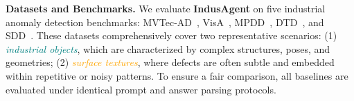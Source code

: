 \documentclass{article}
\begin{document}
\textbf{Datasets and Benchmarks.}
We evaluate \textbf{IndusAgent} on five industrial anomaly detection benchmarks: MVTec-AD~\citep{mvtec}, VisA~\citep{visa}, MPDD~\citep{mpdd}, DTD~\citep{dtd}, and SDD~\citep{sdd}. 
These datasets comprehensively cover two representative scenarios: (1) \textcolor{teal}{\emph{industrial objects}}, which are characterized by complex structures, poses, and geometries; (2) \textcolor{orange}{\emph{surface textures}}, where defects are often subtle and embedded within repetitive or noisy patterns. 
To ensure a fair comparison, all baselines are evaluated under identical prompt and answer parsing protocols.



\end{document}
